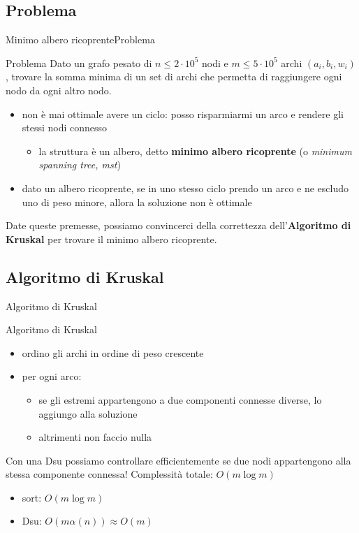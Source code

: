 \documentclass[compress]{beamer}
\begin{document}
\subsection{Problema}
\begin{frame}{Minimo albero ricoprente}{Problema}
    \begin{exampleblock}{Problema}
        Dato un grafo pesato di $n \leq 2 \cdot 10^5$ nodi e $m \leq 5 \cdot 10^5$ archi $(a_i, b_i, w_i)$, trovare la somma minima di un set di archi che permetta di raggiungere ogni nodo da ogni altro nodo.
    \end{exampleblock}
    \pause
    \begin{itemize}
        \item non \`e mai ottimale avere un ciclo: posso risparmiarmi un arco e rendere gli stessi nodi connesso
        \begin{itemize}
            \item la struttura \`e un albero, detto \textbf{minimo albero ricoprente} (o \textit{minimum spanning tree, mst})
        \end{itemize}
        \item dato un albero ricoprente, se in uno stesso ciclo prendo un arco e ne escludo uno di peso minore, allora la soluzione non \`e ottimale
    \end{itemize}
    \pause
    Date queste premesse, possiamo convincerci della correttezza dell'\textbf{Algoritmo di Kruskal} per trovare il minimo albero ricoprente.
\end{frame}

\subsection{Algoritmo di Kruskal}
\begin{frame}{Algoritmo di Kruskal}{}
    \begin{block}{Algoritmo di Kruskal}
        \begin{itemize}
            \item ordino gli archi in ordine di peso crescente
            \item per ogni arco:
                \begin{itemize}
                    \item se gli estremi appartengono a due componenti connesse diverse, lo aggiungo alla soluzione
                    \item altrimenti non faccio nulla
                \end{itemize}
        \end{itemize}
    \end{block}
    \pause
    Con una Dsu possiamo controllare efficientemente se due nodi appartengono alla stessa componente connessa!
    \pause
    \vfill
    Complessit\`a totale: $O(m \log m)$
    \begin{itemize}
        \item sort: $O(m \log m)$
        \item Dsu: $O(m \alpha(n)) \approx O(m)$
    \end{itemize}
\end{frame}
\end{document}
